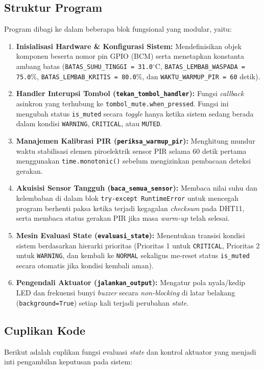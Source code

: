 \documentclass[12pt, a4paper]{article}
\begin{document}
\subsection{Struktur Program}
Program dibagi ke dalam beberapa blok fungsional yang modular, yaitu:
\begin{enumerate}
    \item \textbf{Inisialisasi Hardware \& Konfigurasi Sistem:} Mendefinisikan objek komponen beserta nomor pin GPIO (BCM) serta 
    menetapkan konstanta ambang batas (\texttt{BATAS\_SUHU\_TINGGI = 31.0}$^\circ$C, \texttt{BATAS\_LEMBAB\_WASPADA = 75.0}\%, 
    \texttt{BATAS\_LEMBAB\_KRITIS = 80.0}\%, dan \texttt{WAKTU\_WARMUP\_PIR = 60} detik).
    \item \textbf{Handler Interupsi Tombol (\texttt{tekan\_tombol\_handler}):} Fungsi \textit{callback} asinkron yang terhubung ke
     \texttt{tombol\_mute.when\_pressed}. Fungsi ini mengubah status \texttt{is\_muted} secara \textit{toggle} hanya ketika sistem 
     sedang berada dalam kondisi \texttt{WARNING}, \texttt{CRITICAL}, atau \texttt{MUTED}.
    \item \textbf{Manajemen Kalibrasi PIR (\texttt{periksa\_warmup\_pir}):} Menghitung mundur waktu stabilisasi elemen piroelektrik
     sensor PIR selama 60 detik pertama menggunakan \texttt{time.monotonic()} sebelum mengizinkan pembacaan deteksi gerakan.
    \item \textbf{Akuisisi Sensor Tangguh (\texttt{baca\_semua\_sensor}):} Membaca nilai suhu dan kelembaban di dalam blok 
    \texttt{try-except RuntimeError} untuk mencegah program berhenti paksa ketika terjadi kegagalan \textit{checksum} pada DHT11, 
    serta membaca status gerakan PIR jika masa \textit{warm-up} telah selesai.
    \item \textbf{Mesin Evaluasi State (\texttt{evaluasi\_state}):} Menentukan transisi kondisi sistem berdasarkan hierarki 
    prioritas (Prioritas 1 untuk \texttt{CRITICAL}, Prioritas 2 untuk \texttt{WARNING}, dan kembali ke \texttt{NORMAL} sekaligus 
    me-reset status \texttt{is\_muted} secara otomatis jika kondisi kembali aman).
    \item \textbf{Pengendali Aktuator (\texttt{jalankan\_output}):} Mengatur pola nyala/kedip LED dan frekuensi bunyi 
    \textit{buzzer} secara \textit{non-blocking} di latar belakang (\texttt{background=True}) setiap kali terjadi perubahan 
    \textit{state}.
\end{enumerate}

\subsection{Cuplikan Kode}
Berikut adalah cuplikan fungsi evaluasi \textit{state} dan kontrol aktuator yang menjadi inti pengambilan keputusan pada sistem:
\end{document}
